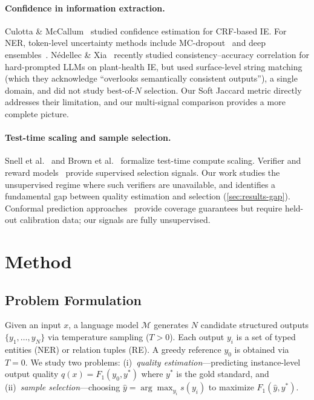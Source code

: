 \documentclass[11pt]{article}
\begin{document}
\paragraph{Confidence in information extraction.}
Culotta \& McCallum~\cite{culotta2004confidence} studied confidence estimation for CRF-based IE.
For NER, token-level uncertainty methods include MC-dropout~\cite{gal2016dropout,xiao2019quantifying} and deep ensembles~\cite{lakshminarayanan2017simple,shelmanov2021certain}.
N\'{e}dellec \& Xia~\cite{nedellec2026consistency} recently studied consistency--accuracy correlation for hard-prompted LLMs on plant-health IE, but used surface-level string matching (which they acknowledge ``overlooks semantically consistent outputs''), a single domain, and did not study best-of-$N$ selection.
Our Soft Jaccard metric directly addresses their limitation, and our multi-signal comparison provides a more complete picture.

\paragraph{Test-time scaling and sample selection.}
Snell et al.~\cite{snell2024scaling} and Brown et al.~\cite{brown2024tts} formalize test-time compute scaling.
Verifier and reward models~\cite{cobbe2021training,lightman2023lets} provide supervised selection signals.
Our work studies the unsupervised regime where such verifiers are unavailable, and identifies a fundamental gap between quality estimation and selection (\cref{sec:results-gap}).
Conformal prediction approaches~\cite{fisch2021conformal,angelopoulos2021gentle} provide coverage guarantees but require held-out calibration data; our signals are fully unsupervised.

\section{Method}
\label{sec:method}

\subsection{Problem Formulation}

Given an input $x$, a language model $\mathcal{M}$ generates $N$ candidate structured outputs $\{y_1, \ldots, y_N\}$ via temperature sampling ($T{>}0$).
Each output $y_i$ is a set of typed entities (NER) or relation tuples (RE).
A greedy reference $y_0$ is obtained via $T{=}0$.
We study two problems: (i)~\emph{quality estimation}---predicting instance-level output quality $q(x) = F_1(y_0, y^*)$ where $y^*$ is the gold standard, and (ii)~\emph{sample selection}---choosing $\hat{y} = \arg\max_{y_i} s(y_i)$ to maximize $F_1(\hat{y}, y^*)$.
\end{document}
